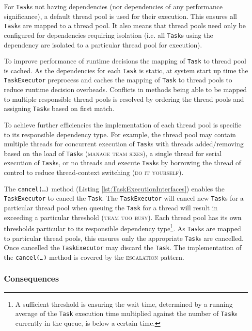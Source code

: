 \documentclass[prodmode]{style/acmlarge}
\begin{document}
For \texttt{Task}s not having dependencies (nor dependencies of any performance
significance), a default thread pool is used for their execution.  This ensures
all \texttt{Task}s are mapped to a thread pool.  It also means that thread pools
need only be configured for dependencies requiring isolation (i.e. all
\texttt{Task}s using the dependency are isolated to a particular thread pool for
execution).

To improve performance of runtime decisions the mapping of \texttt{Task} to
thread pool is cached.  As the dependencies for each \texttt{Task} is static, at
system start up time the \texttt{TaskExecutor} preprocess and caches the mapping
of \texttt{Task} to thread pools to reduce runtime decision overheads. 
Conflicts in methods being able to be mapped to multiple responsible thread
pools is resolved by ordering the thread pools and assigning \texttt{Task}s
based on first match.

To achieve further efficiencies the implementation of each thread pool is
specific to its responsible dependency type.  For example, the thread pool may
contain multiple threads for concurrent execution of \texttt{Task}s with threads
added/removing based on the load of \texttt{Task}s (\textsc{manage team sizes}),
a single thread for serial execution of \texttt{Task}s, or no threads and
execute \texttt{Task}s by borrowing the thread of control to reduce
thread-context switching (\textsc{do it yourself}).

The \texttt{cancel(\ldots)} method (Listing \ref{lst:TaskExecutionInterfaces})
enables the \texttt{TaskExecutor} to cancel the \texttt{Task}. The
\texttt{Task\-Executor} will cancel new \texttt{Task}s for a particular thread
pool when queuing the \texttt{Task} for a thread will result in exceeding a
particular threshold (\textsc{team too busy}).  Each thread pool has its own
thresholds particular to its responsible dependency type\footnote{A sufficient
threshold is ensuring the wait time, determined by a running average of the
\texttt{Task} execution time multiplied against the number of \texttt{Task}s
currently in the queue, is below a certain time.}.  As \texttt{Task}s are mapped
to particular thread pools, this ensures only the appropriate \texttt{Task}s are
cancelled.  Once cancelled the \texttt{TaskExecutor} may discard the
\texttt{Task}.  The implementation of the \texttt{can\-cel(\ldots)} method is
covered by the \textsc{escalation} pattern.


\subsubsection*{Consequences}
\end{document}
